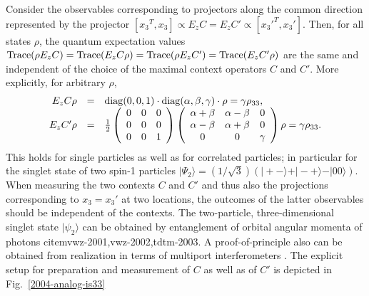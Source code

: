 Consider the observables corresponding to projectors along the common direction
represented by the projector
$[{x_3}^T, {x_3}]\propto E_zC=E_zC' \propto [{x_3'}^T, {x_3'}]$.
Then, for all states $\rho$, the quantum expectation values
$
{\rm Trace} (\rho E_zC) =
{\rm Trace} (E_zC\rho )=
{\rm Trace} (\rho E_zC')=
{\rm Trace} (E_zC'\rho )
$
are the same and independent of the choice of the maximal context operators
$C$ and $C'$.
More explicitly, for arbitrary $\rho$,
\begin{equation}
\begin{array}{rcl}
E_zC\rho &=&
{\rm diag}(0 , 0 , 1 )
\cdot
{\rm diag}(\alpha , \beta , \gamma )
\cdot
\rho
= \gamma \rho_{33},
\\
E_zC'\rho &=&
\frac{1}{2}
\left(
  \begin{array}{ccc}
      0&0 &0 \\
    0&0&0\\
0&0&1
    \end{array}
\right)
\left(
  \begin{array}{ccc}
    \alpha +\beta & \alpha -\beta &0 \\
    \alpha -\beta &\alpha +\beta  &0\\
0&0&\gamma
    \end{array}
\right) \rho = \gamma \rho_{33}.
    \end{array}
\label{2004-qnc-eq1}
\end{equation}
This holds for single particles as well as for correlated particles;
in particular for the singlet state
of two spin-1 particles \cite{mermin80,peres-92}
$
\vert \Psi_2 \rangle
= ({1/ \sqrt{3}})(
\vert + -\rangle
+
\vert - +\rangle
-
\vert 0 0\rangle
)$.
When measuring the two contexts $C$ and $C'$ and thus also
the projections corresponding to $x_3=x_3'$ at two locations,
the outcomes of the latter observables should be independent of the contexts.
The two-particle, three-dimensional singlet state  $\vert \psi_2 \rangle$
can be obtained by entanglement of orbital angular momenta of photons cite{mvwz-2001,vwz-2002,tdtm-2003}.
A proof-of-principle also can be obtained from
realization in terms of multiport interferometers \cite{rzbb,zukowski-97}.
The explicit setup for preparation and measurement \cite{svozil-2004-analog}
of $C$ as well as of $C'$ is depicted in
Fig.~\ref{2004-analog-is33}
